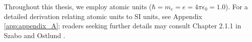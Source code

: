 \documentclass{subfiles}
\begin{document}
Throughout this thesis, we employ atomic units ($\hbar = m_e = e = 4\pi\epsilon_0=1.0$). For a detailed derivation relating atomic units to SI units, see Appendix \ref{app:appendix_A}; readers seeking further details may consult Chapter 2.1.1 in Szabo and Ostlund \cite{szabo1996modern}.


\newpage





\end{document}
